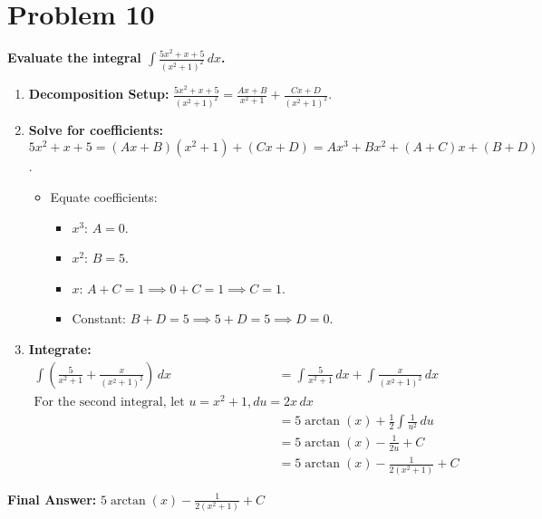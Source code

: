 \documentclass{article}
\begin{document}
\section{Problem 10}
\textbf{Evaluate the integral $\displaystyle\int \frac{5x^2+x+5}{(x^2+1)^2} \,dx$.}
\begin{enumerate}
    \item \textbf{Decomposition Setup:} $\displaystyle\frac{5x^2+x+5}{(x^2+1)^2} = \frac{Ax+B}{x^2+1} + \frac{Cx+D}{(x^2+1)^2}$.
    \item \textbf{Solve for coefficients:} $5x^2+x+5 = (Ax+B)(x^2+1) + (Cx+D) = Ax^3+Bx^2+(A+C)x+(B+D)$.
    \begin{itemize}
        \item Equate coefficients:
        \begin{itemize}
            \item $x^3$: $A=0$.
            \item $x^2$: $B=5$.
            \item $x$: $A+C=1 \implies 0+C=1 \implies C=1$.
            \item Constant: $B+D=5 \implies 5+D=5 \implies D=0$.
        \end{itemize}
    \end{itemize}
    \item \textbf{Integrate:}
    \begin{align*}
    \int \left( \frac{5}{x^2+1} + \frac{x}{(x^2+1)^2} \right) \,dx &= \int \frac{5}{x^2+1} \,dx + \int \frac{x}{(x^2+1)^2} \,dx \\
    \text{For the second integral, let } u=x^2+1, du=2x\,dx \\
    &= 5\arctan(x) + \frac{1}{2}\int\frac{1}{u^2}\,du \\
    &= 5\arctan(x) - \frac{1}{2u} + C \\
    &= 5\arctan(x) - \frac{1}{2(x^2+1)} + C
    \end{align*}
\end{enumerate}
\textbf{Final Answer:} $\displaystyle 5\arctan(x) - \frac{1}{2(x^2+1)} + C$
\end{document}
